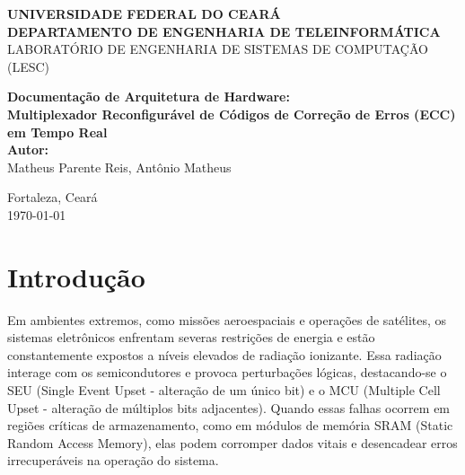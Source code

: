 \documentclass[12pt,a4paper]{article}
\begin{document}
\begin{titlepage}
    \begin{center}
        \vspace*{1cm}
        {\large \bfseries UNIVERSIDADE FEDERAL DO CEARÁ} \\[0.5cm]
        {\large \bfseries DEPARTAMENTO DE ENGENHARIA DE TELEINFORMÁTICA} \\[0.5cm]
        {\large LABORATÓRIO DE ENGENHARIA DE SISTEMAS DE COMPUTAÇÃO (LESC)} \\
        \vfill
        
        {\LARGE \bfseries \color{brandblue} Documentação de Arquitetura de Hardware: \\[0.4cm] 
        Multiplexador Reconfigurável de Códigos de Correção de Erros (ECC) em Tempo Real} \\
        
        \vfill
        {\large \bfseries Autor:} \\[0.2cm]
        {\large Matheus Parente Reis, Antônio Matheus} \\
        \vfill
        
        \vfill
        {\large Fortaleza, Ceará} \\
        {\large \today}
    \end{center}
\end{titlepage}

\newpage
\tableofcontents
\newpage

\section{Introdução}
\label{sec:introducao}

Em ambientes extremos, como missões aeroespaciais e operações de satélites, os sistemas eletrônicos enfrentam severas restrições de energia e estão constantemente expostos a níveis elevados de radiação ionizante. Essa radiação interage com os semicondutores e provoca perturbações lógicas, destacando-se o SEU (Single Event Upset - alteração de um único bit) e o MCU (Multiple Cell Upset - alteração de múltiplos bits adjacentes). Quando essas falhas ocorrem em regiões críticas de armazenamento, como em módulos de memória SRAM (Static Random Access Memory), elas podem corromper dados vitais e desencadear erros irrecuperáveis na operação do sistema.
\end{document}
